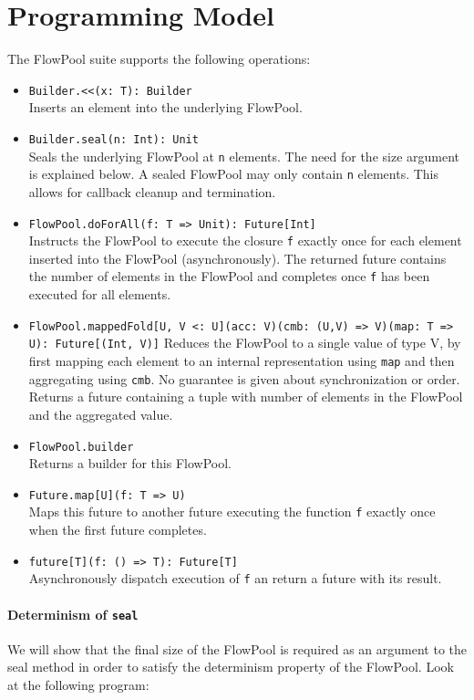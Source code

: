 \documentclass[runningheads,a4paper]{llncs}
\begin{document}
\section{Programming Model}
The FlowPool suite supports the following operations:
\begin{itemize}
\item \texttt{Builder.<<(x: T): Builder}\\
  Inserts an element into the underlying FlowPool.
\item \texttt{Builder.seal(n: Int): Unit}\\
  Seals the underlying FlowPool at \texttt{n} elements. The need for
  the size argument is explained below. A sealed FlowPool may only
  contain \texttt{n} elements. This allows for callback cleanup and
  termination.
\item \texttt{FlowPool.doForAll(f: T => Unit): Future[Int]}\\
  Instructs
  the FlowPool to execute the closure \texttt{f} exactly once for each
  element inserted into the FlowPool (asynchronously). The returned
  future contains the number of elements in the FlowPool and completes
  once \texttt{f} has been executed for all elements.
\item \texttt{FlowPool.mappedFold[U, V <: U](acc: V)(cmb: (U,V) =>
    V)(map: T => U): Future[(Int, V)]}
  Reduces the FlowPool to a single value of type V, by first mapping
  each element to an internal representation using \texttt{map} and
  then aggregating using \texttt{cmb}. No guarantee is given about
  synchronization or order. Returns a future containing a tuple with
  number of elements in the FlowPool and the aggregated value.
\item \texttt{FlowPool.builder}\\
  Returns a builder for this FlowPool.
\item \texttt{Future.map[U](f: T => U)}\\
  Maps this future to another
  future executing the function \texttt{f} exactly once when the first
  future completes.
\item \texttt{future[T](f: () => T): Future[T]}\\
  Asynchronously dispatch execution of \texttt{f} an return a future
  with its result.
\end{itemize}

\paragraph{Determinism of \texttt{seal}} We will show that the final
size of the FlowPool is required as an argument to the seal method in
order to satisfy the determinism property of the FlowPool. Look at the
following program:
\end{document}
